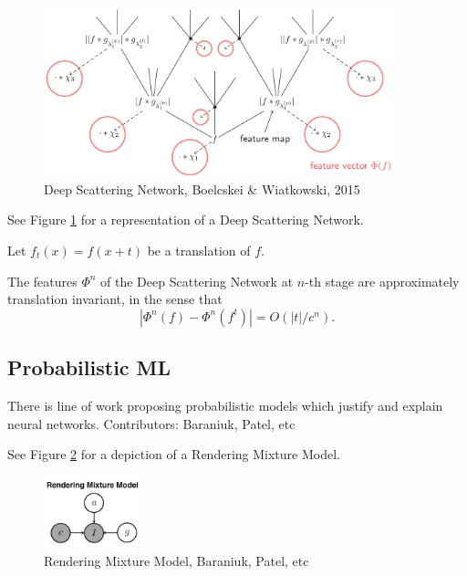 \documentclass[english]{article}
\begin{document}
\begin{figure}
  \centering
  \includegraphics[width=0.9\textwidth]{s.png}
  \caption{Deep Scattering Network, Boelcskei \& Wiatkowski, 2015}
  \label{dsn}
\end{figure}

See Figure \ref{dsn} for a representation of a Deep Scattering Network. 


\begin{theorem}
Let $f_t(x) = f(x+t)$ be a translation of $f$. 

The features $\Phi^n$ of the Deep Scattering Network at $n$-th stage are approximately translation invariant, in the sense that $$|\Phi^n(f) - \Phi^n(f^t)| = O(|t|/c^n).$$
\end{theorem}
%
%
%

\subsection{Probabilistic ML}

There is line of work proposing probabilistic models which justify and explain neural networks.  Contributors: Baraniuk, Patel, etc

See Figure \ref{rmm} for a depiction of a Rendering Mixture Model.

\begin{figure}
  \centering
  \includegraphics[width=0.25\textwidth]{rmm.png}
  \caption{Rendering Mixture Model, Baraniuk, Patel, etc}
  \label{rmm}
\end{figure}
\end{document}
